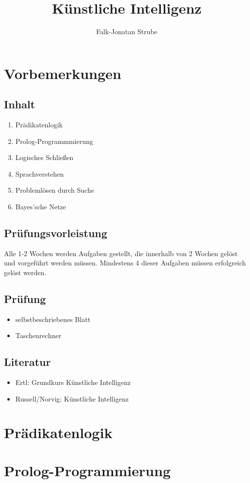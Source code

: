 \documentclass{scrreprt}
\title{Künstliche Intelligenz}
\author{Falk-Jonatan Strube}
\begin{document}
\maketitle
\tableofcontents

\chapter*{Vorbemerkungen}
\section*{Inhalt}
\begin{enumerate}
\item Prädikatenlogik
\item Prolog-Programmmierung
\item Logisches Schließen
\item Sprachverstehen
\item Problemlösen durch Suche
\item Bayes'sche Netze
\end{enumerate}

\section*{Prüfungsvorleistung}
Alle 1-2 Wochen werden Aufgaben gestellt, die innerhalb von 2 Wochen gelöst und vorgeführt werden müssen. Mindestens 4 dieser Aufgaben müssen erfolgreich gelöst werden.

\section*{Prüfung}
\begin{itemize}
\item selbstbeschriebenes Blatt
\item Taschenrechner
\end{itemize}

\section*{Literatur}
\begin{itemize}
\item Ertl: Grundkurs Künstliche Intelligenz
\item Russell/Norvig: Künstliche Intelligenz
\end{itemize}

\chapter{Prädikatenlogik}


\chapter{Prolog-Programmierung}

\end{document}
